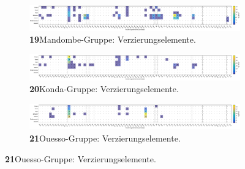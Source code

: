\addtocounter{figure}{-1}
\begin{figure}

\begin{subfigure}{\textwidth}
	\setcounter{subfigure}{18}
	\centering
	\includegraphics[width=\textwidth]{fig/MDB_Verzierungselmente.pdf}
	\caption*{\textbf{19}\hspace{1em}Mandombe-Gruppe: Verzierungselemente. \vspace{\baselineskip}}
	\label{fig:MDB_Verz}
\end{subfigure}

\begin{subfigure}{\textwidth}
	\centering
	\includegraphics[width=\textwidth]{fig/KON_Verzierungselmente.pdf}
	\caption*{\textbf{20}\hspace{1em}Konda-Gruppe: Verzierungselemente. \vspace{\baselineskip}}
	\label{fig:KON_Verz}
\end{subfigure}

\begin{subfigure}{\textwidth}
	\centering
	\includegraphics[width=\textwidth]{fig/OUE_Verzierungselmente.pdf}
	\caption*{\textbf{21}\hspace{1em}Ouesso-Gruppe: Verzierungselemente. \vspace{\baselineskip}}
	\label{fig:OUE_Verz}
\end{subfigure}
\end{figure}

